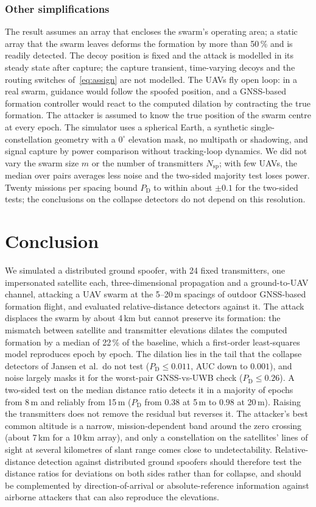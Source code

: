 \documentclass[conference]{IEEEtran}
\newcommand{\PD}{P_{\mathrm{D}}}
\begin{document}
\subsubsection*{Other simplifications}
The result assumes an array that encloses the swarm's operating area; a
static array that the swarm leaves deforms the formation by more than
50\,\% and is readily detected. The decoy position is fixed and the
attack is modelled in its steady state after capture; the capture
transient, time-varying decoys and the routing switches
of~\eqref{eq:assign} are not modelled. The UAVs fly open loop: in a real
swarm, guidance would follow the spoofed position, and a GNSS-based
formation controller would react to the computed dilation by contracting
the true formation. The attacker is assumed to know the true position of
the swarm centre at every epoch. The simulator uses a spherical Earth, a
synthetic single-constellation geometry with a $0^\circ$ elevation mask,
no multipath or shadowing, and signal capture by power comparison
without tracking-loop dynamics. We did not vary the swarm size $m$ or
the number of transmitters $N_{\mathrm{sp}}$; with few UAVs, the median
over pairs averages less noise and the two-sided majority test loses
power. Twenty missions per spacing bound $\PD$ to within about $\pm0.1$
for the two-sided tests; the conclusions on the collapse detectors do not
depend on this resolution.

\section{Conclusion}
\label{sec:conclusion}
We simulated a distributed ground spoofer, with 24 fixed transmitters,
one impersonated satellite each, three-dimensional propagation and a
ground-to-UAV channel, attacking a UAV swarm at the 5--20\,m spacings of
outdoor GNSS-based formation flight, and evaluated relative-distance
detectors against it. The attack displaces the swarm by about 4\,km but
cannot preserve its formation: the mismatch between satellite and
transmitter elevations dilates the computed formation by a median of
22\,\% of the baseline, which a first-order least-squares model
reproduces epoch by epoch. The dilation lies in the tail that the
collapse detectors of Jansen et al.\ do not test ($\PD\le0.011$, AUC
down to $0.001$), and noise largely masks it for the worst-pair
GNSS-vs-UWB check ($\PD\le0.26$). A two-sided test on the median
distance ratio detects it in a majority of epochs from 8\,m and reliably
from 15\,m ($\PD$ from $0.38$ at 5\,m to $0.98$ at 20\,m). Raising the
transmitters does not remove the residual but reverses it. The
attacker's best common altitude is a narrow, mission-dependent band
around the zero crossing (about 7\,km for a 10\,km array), and only a
constellation on the satellites' lines of sight at several kilometres
of slant range comes close to undetectability. Relative-distance
detection against distributed ground spoofers should therefore test the
distance ratios for deviations on both sides rather than for collapse,
and should be complemented by direction-of-arrival or absolute-reference
information against airborne attackers that can also reproduce the
elevations.
\end{document}
